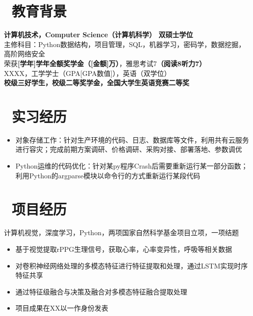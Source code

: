 \documentclass{resume}
\begin{document}
\pagestyle{empty}
\name{[姓名]}
\basicInfo{
    \email{[邮箱]} \textperiodcentered\ 
    \phone{[手机号]} \textperiodcentered\ 
    \text{[出生年份]年[出生月份]生}
  }

\section{\faGraduationCap\ 教育背景}
\textbf{计算机技术，Computer Science（计算机科学） 双硕士学位} \\
主修科目：Python数据结构，项目管理，SQL，机器学习，密码学，数据挖掘，高阶网络安全 \\
荣获\textbf{[学年]学年全额奖学金（[金额]万）}，雅思考试7\textbf{（阅读8听力7）} \\

XXXX，工学学士（GPA[GPA数值]），英语（双学位） \\
\textbf{校级三好学生，校级二等奖学金，全国大学生英语竞赛二等奖}

\section{\faUsers\ 实习经历}
\begin{itemize}
  \item 对象存储工作：针对生产环境的代码、日志、数据库等文件，利用共有云服务进行容灾；完成前期方案调研、价格调研、采购对接、部署落地、参数调优
  \item Python运维的代码优化：针对某py程序Crash后需要重新运行某一部分函数；利用Python的argparse模块以命令行的方式重新运行某段代码
\end{itemize}

\section{\faUsers\ 项目经历}
计算机视觉，深度学习，Python，两项国家自然科学基金项目立项，一项结题
\begin{itemize}
  \item 基于视觉提取rPPG生理信号，获取心率，心率变异性，呼吸等相关数据
  \item 对卷积神经网络处理的多模态特征进行特征提取和处理，通过LSTM实现时序特征共享
  \item 通过特征级融合与决策及融合对多模态特征融合提取处理
  \item 项目成果在XX以一作身份发表
\end{itemize}
\end{document}

